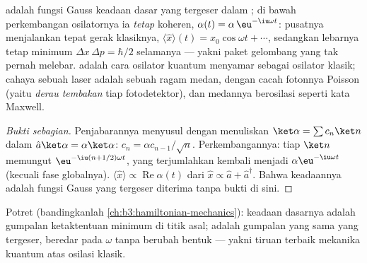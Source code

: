 \begin{proposition}\label{prop:b3:harmonic-oscillator:coherent-motion}
 adalah fungsi Gauss keadaan dasar yang tergeser dalam
; di bawah perkembangan osilatornya ia \emph{tetap} koheren,
$\alpha(t) = \alpha\,\eu^{-\iu\omega t}$: pusatnya menjalankan tepat
gerak klasiknya, $\langle\hat x\rangle(t) =
x_0\cos\omega t + \cdots$, sedangkan lebarnya tetap minimum
$\Delta x\,\Delta p = \hbar/2$ selamanya --- yakni paket gelombang yang
tak pernah melebar.  adalah cara osilator kuantum
menyamar sebagai osilator klasik; cahaya sebuah laser adalah  sebuah ragam medan, dengan cacah fotonnya Poisson (yaitu
\emph{derau tembakan} tiap fotodetektor), dan medannya berosilasi
seperti kata Maxwell.
\end{proposition}

\begin{proof}[Bukti sebagian]
Penjabarannya menyusul dengan menuliskan $\ket\alpha = \sum c_n\ket n$
dalam $\hat a\ket\alpha = \alpha\ket\alpha$: $c_n = \alpha c_{n-1}/\sqrt
n$. Perkembangannya: tiap $\ket n$ memungut $\eu^{-\iu(n + 1/2)\omega t}$,
yang terjumlahkan kembali menjadi  $\alpha\eu^{-\iu\omega t}$
(kecuali fase globalnya). $\langle\hat x\rangle \propto
\operatorname{Re}\alpha(t)$ dari $\hat x \propto \hat a +
\hat a^\dagger$. Bahwa keadaannya adalah fungsi Gauss yang tergeser
diterima tanpa bukti di sini.
\end{proof}

\begin{omfigure}

{\small Potret  (bandingkanlah
\cref{ch:b3:hamiltonian-mechanics}): keadaan dasarnya adalah gumpalan
ketaktentuan minimum di titik asal;  adalah gumpalan yang
sama yang tergeser, beredar pada $\omega$ tanpa berubah bentuk --- yakni
tiruan terbaik mekanika kuantum atas osilasi klasik.}
\end{omfigure}

